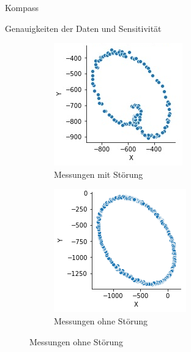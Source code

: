 \documentclass[12pt]{report}
\begin{document}
\begin{section}{Kompass}
\begin{subsection}{Genauigkeiten der Daten und Sensitivität}
  \begin{figure}[h!]
    \centering
    \captionsetup[subfigure]{labelformat=empty}
    \begin{subfigure}{0.45\linewidth}
      \centering
      \includegraphics[width=\linewidth]{lernportfolio_assets/MagnetDatenStorung}
      \caption{Messungen mit Störung}
    \end{subfigure}
    \begin{subfigure}{0.45\linewidth}
      \centering
      \includegraphics[width=\linewidth]{lernportfolio_assets/MagnetDaten}
      \caption{Messungen ohne Störung}
    \end{subfigure}
  \end{figure}
  

\end{subsection}
\end{section}
\end{document}
